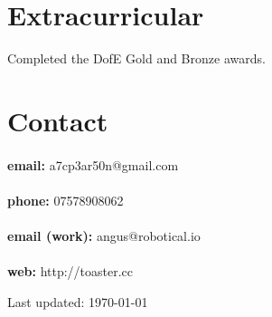 \documentclass[10pt, a4paper]{article}
\begin{document}

\section*{Extracurricular}

Completed the DofE Gold and Bronze awards.



\section*{Contact}

\paragraph*{}
\textbf{email:} a7cp3ar50n@gmail.com

\paragraph*{}
\textbf{phone:} 07578908062


\paragraph*{}
\textbf{email (work):} angus@robotical.io


\paragraph*{}
\textbf{web:} http://toaster.cc

\vfill{}

\begin{center}
  {
    \scriptsize  Last updated: \today
  }
\end{center}
\end{document}
